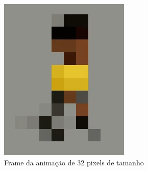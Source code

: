 \begin{figure}[htbp]
\begin{subfigure}{0.21\linewidth}
        \includegraphics[width=1\linewidth]{figs/godmodAI/print32.PNG}
        \caption{\small Frame da animação de 32 pixels de tamanho}
        \label{fig:godmodAIFrame32}
    \end{subfigure}
    \begin{subfigure}{0.21\linewidth}

\end{subfigure}
\end{figure}
